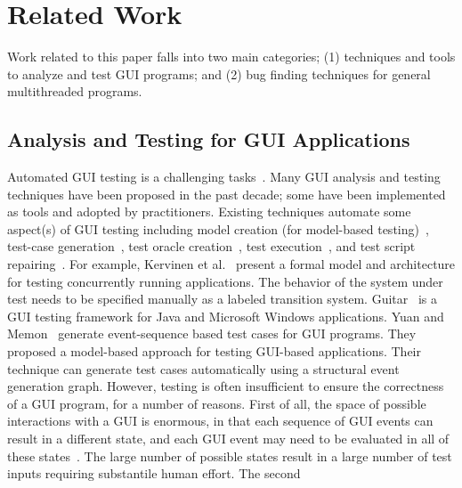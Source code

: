 \section{Related Work}

Work related to this paper falls into two main categories; (1)
techniques and tools to analyze and test GUI programs; and (2)
bug finding techniques for general multithreaded programs.

\subsection{Analysis and Testing for GUI Applications}

Automated GUI testing is a challenging tasks~\cite{Bertolino:2007:STR:1253532.1254712,
Harrold:2000:TR:336512.336532}.
 Many GUI analysis and testing techniques have been proposed in the past decade; some have been
implemented as tools and adopted by practitioners. Existing techniques automate
some aspect(s) of GUI testing including model creation
(for model-based testing)~\cite{androidtesting, Xie:2006:MTC:1172962.1172990},
test-case generation~\cite{YuanCohenMemonTSE2011, YuanMemonICSE2007},
test oracle creation~\cite{MemonFSE2000}, test execution~\cite{MemonFSE2001},
and test script repairing~\cite{Huang:2010:RGT:1828417.1828465, Daniel:2011:AGR:2002931.2002937}.
For example,
Kervinen et al.~\cite{Kervinen06model-basedtesting} present a formal model and architecture for testing
concurrently running applications. The behavior of the system under test
needs to be specified manually as a labeled transition system. 
Guitar~\cite{YuanCohenMemonTSE2011, YuanMemonICSE2007, Xie:2006:MTC:1172962.1172990}
is a GUI testing framework for Java and Microsoft Windows applications. 
Yuan and Memon~\cite{YuanMemonICSE2007} generate event-sequence based test cases for GUI
programs. They proposed a model-based approach for testing GUI-based applications.
Their technique can generate test cases automatically using a structural event
generation graph. 
However, testing is often insufficient to ensure the correctness of a GUI program, for
a number of reasons. First of all, the space of possible interactions
with a GUI is enormous, in that each sequence of GUI
events can result in a different state, and each GUI event
may need to be evaluated in all of these states~\cite{YuanMemonICSE2007}.
The large number of possible states result in a large number of
test inputs requiring substantile human effort. The second
